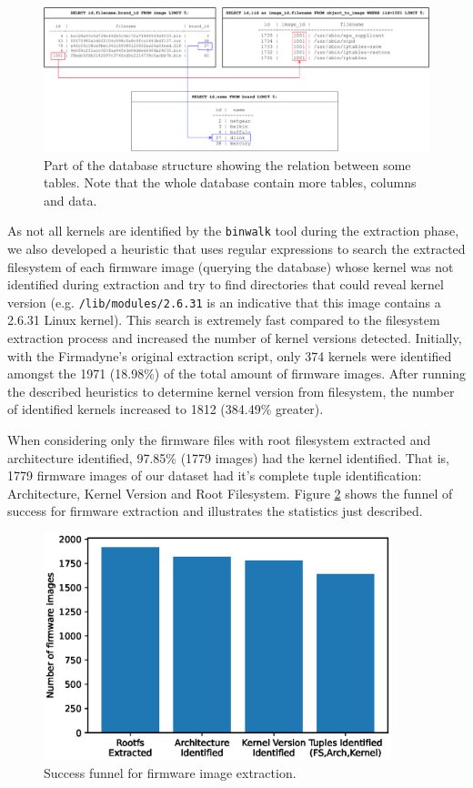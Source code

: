 \begin{figure}[H]
    \centering
    \includegraphics[width=1.0 \textwidth]{figs/SQL_Schema.pdf}
    \caption{Part of the database structure showing the relation between some tables. Note that the whole database contain more tables, columns and data.}
    \label{fig:sql-schema}
\end{figure}

As not all kernels are identified by the {\tt binwalk} tool during the extraction phase, we also developed a heuristic that uses regular expressions to search the extracted filesystem of each firmware image (querying the database) whose kernel was not identified during extraction and try to find directories that could reveal kernel version (e.g. {\tt /lib/modules/2.6.31} is an indicative that this image contains a 2.6.31 Linux kernel). This search is extremely fast compared to the filesystem extraction process and increased the number of kernel versions detected. Initially, with the Firmadyne's \cite{firmadyne} original extraction script, only 374 kernels were identified amongst the 1971 (18.98\%) of the total amount of firmware images. After running the described heuristics to determine kernel version from filesystem, the number of identified kernels increased to 1812 (384.49\% greater).

When considering only the firmware files with root filesystem extracted and architecture identified, 97.85\% (1779 images) had the kernel identified. That is, 1779 firmware images of our dataset had it's complete tuple identification: Architecture, Kernel Version and Root Filesystem. Figure \ref{fig:stats-funnel} shows the funnel of success for firmware extraction and illustrates the statistics just described.

\begin{figure}[H]
    \centering
    \includegraphics[width=0.90\textwidth]{figs/extraction_funnel.eps}
    \caption{Success funnel for firmware image extraction.}
    \label{fig:stats-funnel}
\end{figure}


